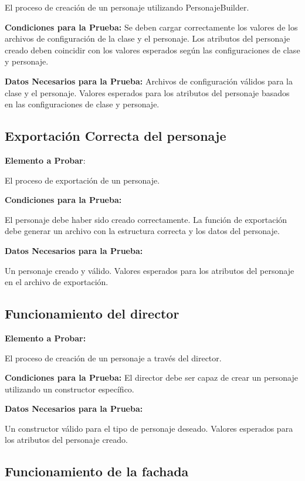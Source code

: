 \documentclass{article}
\begin{document}
\begin{itemize}
   El proceso de creación de un personaje utilizando PersonajeBuilder.
   
    \textbf{Condiciones para la Prueba:}
        Se deben cargar correctamente los valores de los archivos de configuración de la clase y el personaje.
        Los atributos del personaje creado deben coincidir con los valores esperados según las configuraciones de clase y personaje.
        
    \textbf{Datos Necesarios para la Prueba:}
        Archivos de configuración válidos para la clase y el personaje.
        Valores esperados para los atributos del personaje basados en las configuraciones de clase y personaje.

\subsection{Exportación Correcta del personaje}


    \textbf{Elemento a Probar}:
    
     El proceso de exportación de un personaje.
    
   \textbf{ Condiciones para la Prueba:}
   
        El personaje debe haber sido creado correctamente.
        La función de exportación debe generar un archivo con la estructura correcta y los datos del personaje.
        
    \textbf{Datos Necesarios para la Prueba:}
    
        Un personaje creado y válido.
        Valores esperados para los atributos del personaje en el archivo de exportación.

\subsection{Funcionamiento del director}

   \textbf{ Elemento a Probar:} 
   
   El proceso de creación de un personaje a través del director.
   
   \textbf{ Condiciones para la Prueba:}
        El director debe ser capaz de crear un personaje utilizando un constructor específico.
        
    \textbf{Datos Necesarios para la Prueba:}
    
        Un constructor válido para el tipo de personaje deseado.
        Valores esperados para los atributos del personaje creado.

\subsection{Funcionamiento de la fachada}


\end{itemize}
\end{document}
